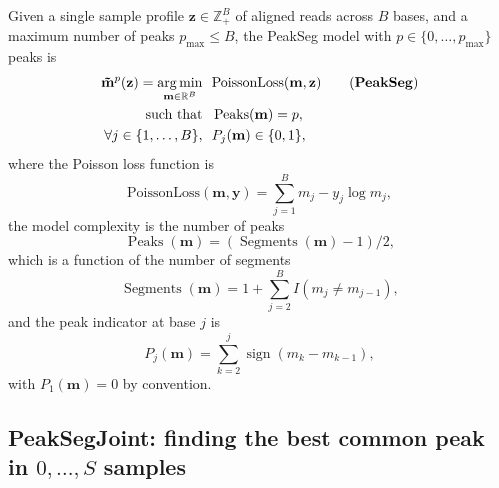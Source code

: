 \documentclass{article} %
\DeclareMathOperator*{\argmin}{arg\,min}
\DeclareMathOperator*{\Peaks}{Peaks}
\DeclareMathOperator*{\Segments}{Segments}
\newcommand{\sign}{\operatorname{sign}}
\newcommand{\RR}{\mathbb R}
\newcommand{\ZZ}{\mathbb Z}
\begin{document}
Given a single sample profile $\mathbf z\in\ZZ_+^B$ of aligned reads
across $B$ bases, and a maximum number of peaks $p_{\text{max}}\leq
B$, the PeakSeg model with $p\in\{0, \dots, p_{\text{max}}\}$ peaks is
\begin{align}
  \label{PeakSeg}
  \mathbf{\tilde m}^p(\mathbf z)  =
    \argmin_{\mathbf m\in\RR^{B}} &\ \ 
    \text{PoissonLoss}(\mathbf m, \mathbf z) 
    \tag{\textbf{PeakSeg}}
\\
    \text{such that} &\ \  \Peaks(\mathbf m)=p,  \\
     \forall j\in\{1, \dots, B\}, &\ \ P_j(\mathbf m) \in\{0, 1\},
\end{align}
where the Poisson loss function is
\begin{equation}\label{eq:rho}
  \text{PoissonLoss}(\mathbf m, \mathbf y)= \sum_{j=1}^B m_j - y_j \log m_j,
\end{equation} 
the model complexity is the number of peaks
\begin{equation}
  \Peaks(\mathbf m)=(\Segments(\mathbf m)-1)/2,
\end{equation}
which is a function of the number of segments
\begin{equation}
  \Segments(\mathbf m)=1+\sum_{j=2}^B I(m_j \neq m_{j-1}),
\end{equation}
and the peak indicator at base $j$ is
\begin{equation}
  \label{eq:peaks}
  P_j(\mathbf m) = \sum_{k=2}^j \sign( m_{k} - m_{k-1} ),
\end{equation}
with $P_1(\mathbf m)=0$ by convention.

\subsection{PeakSegJoint: finding the best common peak in $0,\dots, S$
  samples}
\end{document}
